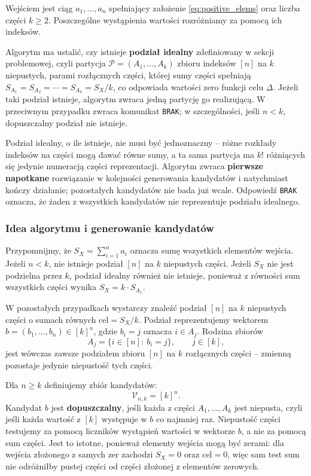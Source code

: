 \documentclass[11pt]{article}
\begin{document}
Wejściem jest ciąg \(a_1,\ldots,a_n\) spełniający założenie \eqref{eq:positive_elems} oraz liczba części \(k\geq 2\).
Poszczególne wystąpienia wartości rozróżniamy za pomocą ich indeksów.

Algorytm ma ustalić, czy istnieje \textbf{podział idealny} zdefiniowany w sekcji problemowej, czyli partycja \(\mathcal{P}=(A_1,\ldots,A_k)\) zbioru indeksów \([n]\) na \(k\) niepustych, parami rozłącznych części, której sumy części spełniają \(S_{A_1}=S_{A_2}=\cdots=S_{A_k}=S_X/k\), co odpowiada wartości zero funkcji celu \(\Delta\). Jeżeli taki podział istnieje, algorytm zwraca jedną partycję go realizującą. W przeciwnym przypadku zwraca komunikat \texttt{BRAK}; w szczególności, jeśli \(n<k\), dopuszczalny podział nie istnieje.

Podział idealny, o ile istnieje, nie musi być jednoznaczny -- różne rozkłady indeksów na części mogą dawać równe sumy, a ta sama partycja ma \(k!\) różniących się jedynie numeracją części reprezentacji. Algorytm zwraca \textbf{pierwsze napotkane} rozwiązanie w kolejności generowania kandydatów i natychmiast kończy działanie; pozostałych kandydatów nie bada już wcale. Odpowiedź \texttt{BRAK} oznacza, że żaden z wszystkich kandydatów nie reprezentuje podziału idealnego.

\subsubsection{Idea algorytmu i generowanie kandydatów}

Przypomnijmy, że \(S_X=\sum_{i=1}^{n}a_i\) oznacza sumę wszystkich elementów wejścia. Jeżeli \(n<k\), nie istnieje podział \([n]\) na \(k\) niepustych części. Jeżeli \(S_X\) nie jest podzielna przez \(k\), podział idealny również nie istnieje, ponieważ z równości sum wszystkich części wynika \(S_X=k\cdot S_{A_1}\).

W pozostałych przypadkach wystarczy znaleźć podział \([n]\) na \(k\) niepustych części o sumach równych \(\mathrm{cel}=S_X/k\). Podział reprezentujemy wektorem \(b=(b_1,\ldots,b_n)\in[k]^n\), gdzie \(b_i=j\) oznacza \(i\in A_j\). Rodzina zbiorów
\begin{equation}
A_j=\{i\in[n]:\ b_i=j\}, \qquad j\in[k],
\end{equation}
jest wówczas zawsze podziałem zbioru \([n]\) na \(k\) rozłącznych części -- zmienną pozostaje jedynie niepustość tych części.

Dla \(n\geq k\) definiujemy zbiór kandydatów:
\begin{equation}
\mathcal{V}_{n,k}=[k]^n.
\end{equation}
Kandydat \(b\) jest \textbf{dopuszczalny}, jeśli każda z części \(A_1,\ldots,A_k\) jest niepusta, czyli jeśli każda wartość z \([k]\) występuje w \(b\) co najmniej raz. Niepustość części testujemy za pomocą liczników wystąpień wartości w wektorze \(b\), a nie za pomocą sum części. Jest to istotne, ponieważ elementy wejścia mogą być zerami: dla wejścia złożonego z samych zer zachodzi \(S_X=0\) oraz \(\mathrm{cel}=0\), więc sam test sum nie odróżniłby pustej części od części złożonej z elementów zerowych.
\end{document}
